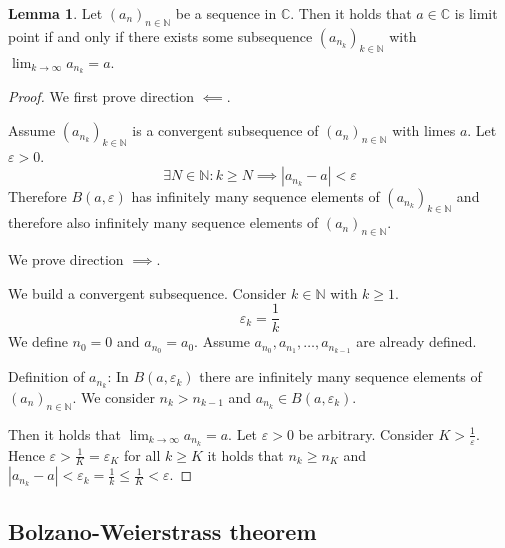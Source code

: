 \documentclass[a4paper,landscape,twocolumn]{article}
\theoremstyle{definition}
\newtheorem{lemma}{Lemma}
\newcommand\abs[1]{\left|#1\right|}
\newcommand\seq[1]{{\left(#1\right)}_{n \in \mathbb N}}
\begin{document}
\begin{lemma}
  Let $\seq{a_n}$ be a sequence in $\mathbb C$. Then it holds that
  $a \in \mathbb C$ is limit point if and only if there exists some subsequence
  $\left(a_{n_k}\right)_{k \in \mathbb N}$ with $\lim_{k \to \infty} a_{n_k} = a$.
\end{lemma}
\begin{proof}
  We first prove direction $\impliedby$.

  Assume $\left(a_{n_k}\right)_{k \in \mathbb N}$ is a convergent subsequence
  of $\seq{a_n}$ with limes $a$.
  Let $\varepsilon > 0$.
  \[ \exists N \in \mathbb N: k \geq N \implies \abs{a_{n_k} - a} < \varepsilon \]
  Therefore $B(a, \varepsilon)$ has infinitely many sequence elements of $\left(a_{n_k}\right)_{k\in\mathbb N}$
  and therefore also infinitely many sequence elements of $\seq{a_n}$.

  We prove direction $\implies$.

  We build a convergent subsequence. Consider $k \in \mathbb N$ with $k \geq 1$.
  \[ \varepsilon_k = \frac1k \]
  We define $n_0 = 0$ and $a_{n_0} = a_0$.
  Assume $a_{n_0}, a_{n_1}, \dots, a_{n_{k-1}}$ are already defined.

  Definition of $a_{n_k}$: In $B(a, \varepsilon_k)$ there are infinitely many sequence elements of $\seq{a_n}$.
  We consider $n_k > n_{k-1}$ and $a_{n_k} \in B(a, \varepsilon_k)$.

  Then it holds that $\lim_{k\to\infty} a_{n_k} = a$.
  Let $\varepsilon > 0$ be arbitrary. Consider $K > \frac1\varepsilon$.
  Hence $\varepsilon > \frac1K = \varepsilon_K$ for all $k \geq K$ it holds that
  $n_k \geq n_K$ and $\abs{a_{n_k} - a} < \varepsilon_k = \frac1k \leq \frac1K < \varepsilon$.
\end{proof}

\subsection{Bolzano-Weierstrass theorem}
\end{document}
